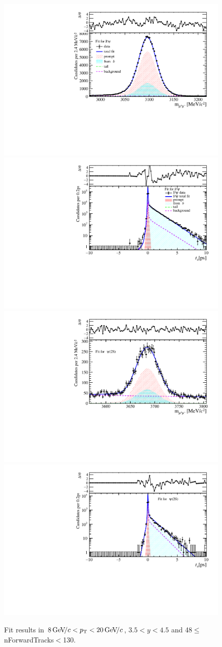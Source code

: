 \begin{figure}[H]
\begin{center}
\includegraphics[width=0.47\linewidth]{pdf/Jpsi/drawmassF/n5y3pt5.pdf}
\includegraphics[width=0.47\linewidth]{pdf/Jpsi/2DFitF/n5y3pt5.pdf}
\vspace*{-0.5cm}
\includegraphics[width=0.47\linewidth]{pdf/Psi2S/drawmassF/n5y3pt5.pdf}
\includegraphics[width=0.47\linewidth]{pdf/Psi2S/2DFitF/n5y3pt5.pdf}
\vspace*{-0.5cm}
\end{center}
\caption{Fit results in $8\text{\,Ge\kern -0.1em V\!/}c<p_{\mathrm{T}}<20\text{\,Ge\kern -0.1em V\!/}c$, $3.5<y<4.5$ and 48$\leq$nForwardTracks$<$130.}
\label{Fitn5y3pt5}
\end{figure}

